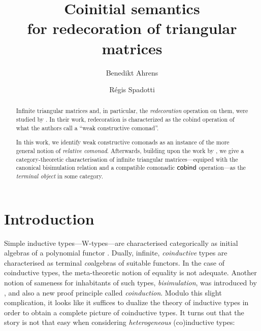 \documentclass{amsart}
\author{Benedikt Ahrens}
\author{R\'egis Spadotti}
\title[Coinitial semantics for redecoration of triangular matrices]{Coinitial semantics \\ for redecoration of triangular matrices}
\begin{document}
\begin{abstract}
  Infinite triangular matrices and, in particular, the \emph{redecoration} operation on them, 
  were studied by \citeauthor{DBLP:conf/types/MatthesP11}. In their work,  redecoration is characterized
  as the cobind operation of what the authors call a \enquote{weak constructive comonad}.
  
  In this work, we identify weak constructive comonads as an instance of the more general notion of 
  \emph{relative comonad}.
  Afterwards, building upon the work by \citeauthor{DBLP:conf/types/MatthesP11}, we give a category-theoretic
  characterisation of infinite triangular matrices---equiped with the canonical bisimulation relation and a 
  compatible comonadic $\mathsf{cobind}$ operation---as the \emph{terminal object}
  in some category.
  
% 

\end{abstract}

\maketitle


\section{Introduction}

 Simple inductive types---\textsf{W}-types---are characterised categorically as initial algebras of
 a polynomial functor \parencite{DBLP:journals/apal/MoerdijkP00}.
 Dually, infinite, \emph{coinductive} types are characterised as terminal \emph{co}algebras of suitable functors.
 In the case of coinductive types, the meta-theoretic notion of equality is not adequate. Another notion of sameness for inhabitants of such types, 
 \emph{bisimulation}, was introduced by \textcite{aczel_nonwellfounded}, and also
 a new proof principle called \emph{coinduction}. 
 Modulo this slight complication, it looks like it suffices to dualize the theory of inductive types in order to obtain
 a complete picture of coinductive types.
 It turns out that the story is not that easy when considering \emph{heterogeneous} (co)inductive types:
 
\end{document}
